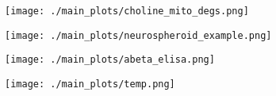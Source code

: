 \begin{figure}[ht]
    \begin{subfigure}[t]{.25\textwidth}
        \caption{}
        \texttt{[image: ./main\_plots/choline\_mito\_degs.png]}        
    \end{subfigure}   
    \begin{subfigure}[t]{.15\textwidth}
        \caption{}
        \texttt{[image: ./main\_plots/neurospheroid\_example.png]}        
    \end{subfigure} 
    \begin{subfigure}[t]{.4\textwidth}
        \caption{}
        \texttt{[image: ./main\_plots/abeta\_elisa.png]}        
    \end{subfigure}  
    \begin{subfigure}[t]{.15\textwidth}
        \caption{}
        \texttt{[image: ./main\_plots/temp.png]}        
    \end{subfigure}  







\end{figure}
